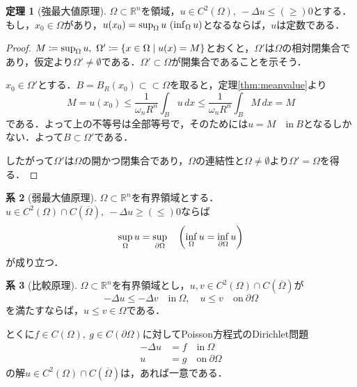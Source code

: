 \documentclass[a4paper]{ltjsarticle}
\newcommand{\Rset}{\mathbb{R}}
\newcommand{\Om}{\Omega}
\newcommand{\pOm}{\partial\Omega}
\newcommand{\Ombar}{\overline{\Omega}}
\newcommand{\ssubset}{\subset\subset}
\newcommand{\inn}{\quad\text{in}\ }
\newcommand{\on}{\quad \text{on}\ }
\newcommand{\1}{\mathbbm{1}}
\numberwithin{equation}{section}
\theoremstyle{definition}
\newtheorem{thm}{定理}[section]
\newtheorem{cor}[thm]{系}
\begin{document}
\begin{thm}[強最大値原理]
    $\Omega\subset\Rset^n$を領域，$u\in C^2(\Omega),\ -\Delta u\leq(\geq) 0$とする．もし，$x_0\in \Omega$があり，$u(x_0)=\sup_\Omega u\ \qty(\inf_{\Omega} u)$となるならば，$u$は定数である．
\end{thm}
\begin{proof}
    $M\coloneqq \sup_\Om u,\ \Om'\coloneqq \qty{x\in\Om\mid u(x)=M}$とおくと，$\Om'$は$\Om$の相対閉集合であり，仮定より$\Omega'\neq\emptyset$である．$\Om'\subset\Om$が開集合であることを示そう．
    
    $x_0\in\Om'$とする．$B=B_R(x_0)\ssubset \Om$を取ると，定理\ref{thm:meanvalue}より
    \begin{equation}
        M=u(x_0)\leq \frac{1}{\omega_n R^n}\int_{B}u\,dx\leq \frac{1}{\omega_nR^n}\int_BM\,dx=M 
    \end{equation}
    である．よって上の不等号は全部等号で，そのためには$u=M\inn B$となるしかない．よって$B\subset\Om'$である．

    したがって$\Om'$は$\Om$の開かつ閉集合であり，$\Om$の連結性と$\Om\neq\emptyset$より$\Om'=\Om$を得る．
\end{proof}
\begin{cor}[弱最大値原理]
    $\Omega\subset\Rset^n$を有界領域とする．$u\in C^2(\Omega)\cap C(\Ombar),\ -\Delta u\geq(\leq)0$ならば
    \begin{equation}
        \sup_{\Om}u=\sup_{\partial\Om}\quad \qty(\inf_{\Om}u=\inf_{\pOm} u)
    \end{equation}
    が成り立つ．
\end{cor}
\begin{cor}[比較原理]\label{cor:comparison}
    $\Om\subset \Rset^n$を有界領域とし，$u,v\in C^2(\Om)\cap C(\Ombar)$が
    \begin{equation}
        -\Delta u\leq -\Delta v\inn \Omega,\quad u\leq v\on \pOm 
    \end{equation}
    を満たすならば，$u\leq v \in \Om$である．

    とくに$f\in C(\Omega),\ g\in C(\pOm)$に対してPoisson方程式のDirichlet問題
\begin{align}
        -\Delta u&=f \inn \Omega\\
        u&=g \on \pOm
\end{align}
の解$u\in C^2(\Om)\cap C(\Ombar)$は，あれば一意である．
\end{cor}
\end{document}
